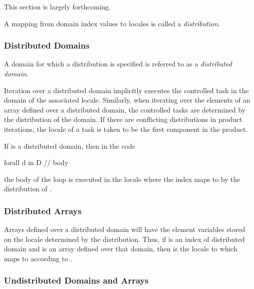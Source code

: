 \begin{openissue}
This section is largely forthcoming.
\end{openissue}

A mapping from domain index values to locales is called a {\em
distribution}.

\subsubsection{Distributed Domains}
\label{Distributed_Domains}

A domain for which a distribution is specified is referred to as a
{\em distributed domain}.

Iteration over a distributed domain implicitly executes the controlled
task in the domain of the associated locale.  Similarly, when
iterating over the elements of an array defined over a distributed
domain, the controlled tasks are determined by the distribution of the
domain.  If there are conflicting distributions in product iterations,
the locale of a task is taken to be the first component in the
product.

\begin{example}
If  is a distributed domain, then in the code
\begin{chapel}
forall d in D {
  // body
}
\end{chapel}
the body of the loop is executed in the locale where the
index  maps to by the distribution of .
\end{example}

\subsubsection{Distributed Arrays}
\label{Distributed_Arrays}

Arrays defined over a distributed domain will have the element
variables stored on the locale determined by the distribution.  Thus,
if  is an index of distributed domain  and  is
an array defined over that domain, then  is the
locale to which  maps to according to .

\subsubsection{Undistributed Domains and Arrays}
\label{Undistributed_Domains_and_Arrays}

